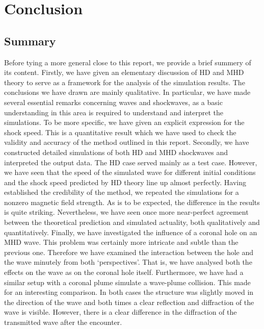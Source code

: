 \section{Conclusion}

\subsection*{Summary}

Before tying a more general close to this report, we provide a brief summery of its content. 
Firstly, we have given an elementary discussion of HD and MHD theory to serve as a framework for the analysis of the simulation results. The conclusions we have drawn are mainly qualitative. In particular, we have made several essential remarks concerning waves and shockwaves, as a basic understanding in this area is required to understand and interpret the simulations. To be more specific, we have given an explicit expression for the shock speed. This is a quantitative result which we have used to check the validity and accuracy of the method outlined in this report.
Secondly, we have constructed detailed simulations of both HD and MHD shockwaves and interpreted the output data. The HD case served mainly as a test case. However, we have seen that the speed of the simulated wave for different initial conditions and the shock speed predicted by HD theory line up almost perfectly. Having established the credibility of the method, we repeated the simulations for a nonzero magnetic field strength. As is to be expected, the difference in the results is quite striking. Nevertheless, we have seen once more near-perfect agreement between the theoretical prediction and simulated actuality, both qualitatively and quantitatively.
Finally, we have investigated the influence of a coronal hole on an MHD wave. This problem was certainly more intricate and subtle than the previous one. Therefore we have examined the interaction between the hole and the wave minutely from both `perspectives'. That is, we have analysed both the effects on the wave as on the coronal hole itself. Furthermore, we have had a similar setup with a coronal plume simulate a wave-plume collision. This made for an interesting comparison. In both cases the structure was slightly moved in the direction of the wave and both times a clear reflection and diffraction of the wave is visible. However, there is a clear difference in the diffraction of the transmitted wave after the encounter. 

